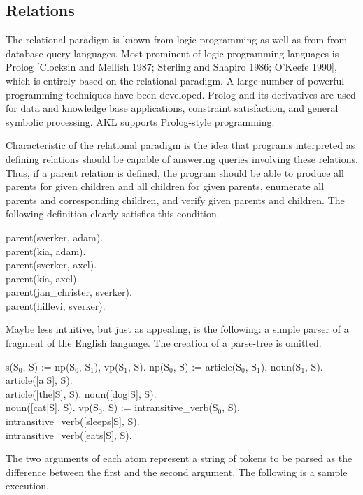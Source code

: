 \subsection{Relations}

The relational paradigm is known from logic programming as well as
from from database query languages.  Most prominent of logic
programming languages is Prolog [Clocksin and Mellish 1987; Sterling
and Shapiro 1986; O'Keefe 1990], which is entirely based on the
relational paradigm.  A large number of powerful programming techniques
have been developed.  Prolog and its derivatives are used for data and
knowledge base applications, constraint satisfaction, and general
symbolic processing.  AKL supports Prolog-style programming.

Characteristic of the relational paradigm is the idea that programs
interpreted as defining relations should be capable of answering
queries involving these relations.  Thus, if a parent relation is
defined, the program should be able to produce all parents for given
children and all children for given parents, enumerate all parents and
corresponding children, and verify given parents and children.  The
following definition clearly satisfies this condition.
%
\begin{program}
parent(sverker, adam).  \\
parent(kia, adam).  \\
parent(sverker, axel).  \\
parent(kia, axel).  \\
parent(jan_christer, sverker).  \\
parent(hillevi, sverker).
\end{program}%
%
Maybe less intuitive, but just as appealing, is the following: a
simple parser of a fragment of the English language.  The creation of
a parse-tree is omitted.
%
\begin{program}
s(S$_0$, S) := np(S$_0$, S$_1$), vp(S$_1$, S).  \nl
np(S$_0$, S) := article(S$_0$, S$_1$), noun(S$_1$, S).  \nl
article([a|S], S).  \\
article([the|S], S).  \nl
noun([dog|S], S).  \\
noun([cat|S], S).  \nl
vp(S$_0$, S) := intransitive_verb(S$_0$, S).  \nl
intransitive_verb([sleeps|S], S).  \\
intransitive_verb([eats|S], S).
\end{program}%
%
The two arguments of each atom represent a string of tokens to be
parsed as the difference between the first and the second
argument.  The following is a sample execution.
